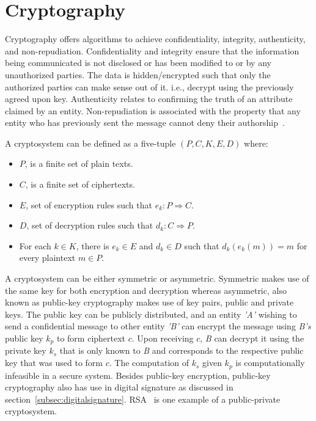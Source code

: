 \section{Cryptography} \label{sec:cryptography}
Cryptography offers algorithms to achieve confidentiality, integrity,
authenticity, and non-repudiation. Confidentiality and integrity ensure that
the information being communicated is not disclosed or has been modified to or
by any unauthorized parties. The data is hidden/encrypted such that only the
authorized parties can make sense out of it. i.e., decrypt using the previously
agreed upon key. Authenticity relates to confirming the truth of an attribute
claimed by an entity. Non-repudiation is associated with the property that any
entity who has previously sent the message cannot deny their
authorship~\cite{katz1996handbook}. \par 
A cryptosystem can be defined as a five-tuple $(P, C, K, E, D)$ where: 
\begin{itemize}
	\item $P$, is a finite set of plain texts.
	\item $C$, is a finite set of ciphertexts.
	\item $E$, set of encryption rules such that $e_{k}:P \Rightarrow C$.
	\item $D$, set of decryption rules such that $d_{k}:C \Rightarrow P$. 
	\item For each $k \in K$, there is $e_k \in E$ and $d_k \in D$ such that
		$d_k(e_k(m)) = m$ for every plaintext $m \in P$.
\end{itemize}
A cryptosystem can be either symmetric or asymmetric. Symmetric makes use of
the same key for both encryption and decryption whereas asymmetric, also known
as public-key cryptography makes use of key pairs, public and private keys. The
public key can be publicly distributed, and an entity \textit{'A'} wishing to
send a confidential message to other entity \textit{'B'} can encrypt the
message using \textit{B's} public key $k_{p}$ to form ciphertext $c$. Upon
receiving $c$, \textit{B} can decrypt it using the private key $k_{s}$ that is
only known to \textit{B} and corresponds to the respective public key that was
used to form $c$. The computation of $k_{s}$ given $k_{p}$ is computationally
infeasible in a secure system. Besides public-key encryption, public-key
cryptography also has use in digital signature as discussed in
section~\ref{subsec:digitalsignature}. RSA~\cite{rivest1978method} is one example
of a public-private cryptosystem.

